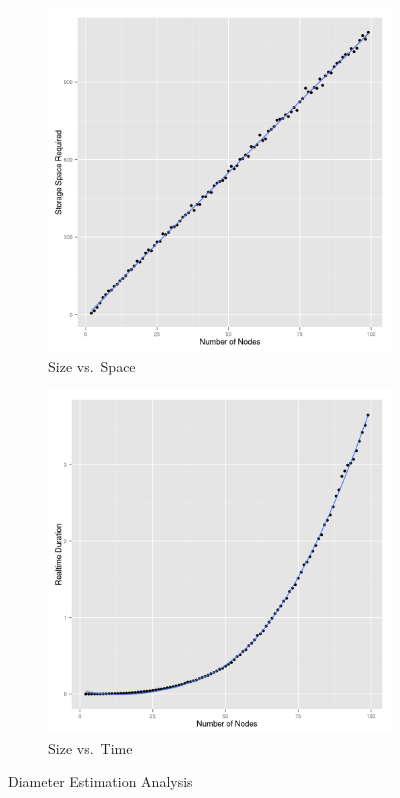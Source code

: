 \documentclass[10pt]{article}
\begin{document}
\begin{easylist}[enumerate]
\begin{figure}[ht]
        \begin{subfigure}[b]{0.48\textwidth}
            \includegraphics[scale=0.35]{./img/sizevsspace.png}
            \caption{Size vs.\ Space}
        \end{subfigure}
        \begin{subfigure}[b]{0.48\textwidth}
            \includegraphics[scale=0.35]{./img/sizevstime.png}
            \caption{Size vs.\ Time}
        \end{subfigure}
        \caption{Diameter Estimation Analysis}
    \end{figure}


\end{easylist}
\end{document}
